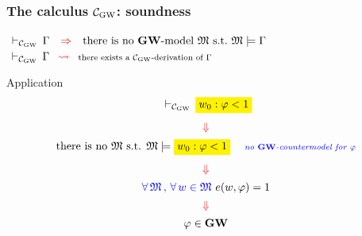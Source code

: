 \begin{frame}
  \frametitle{The calculus $\mathcal{C}_{\mathrm{GW}}$: soundness}
  

  \begin{center}
    \begin{tcolorbox}[colframe=blue!75!black,width=30em]
      \center
      $
      {}\,\vdash_{\mathcal{C}_{\mathrm{GW}}}\, \Gamma
      \quad {\color{red} \Rightarrow}\quad
      \mbox{there is no $\mathbf{GW}$-model $\mathfrak{M}$ s.t.}~\mathfrak{M}\models\Gamma
      $
      \\[1ex]
      $\scriptsize {}\,\vdash_{\mathcal{C}_{\mathrm{GW}}}\, \Gamma \quad {\color{red}\rightsquigarrow} \quad \mbox{there exists a $\mathcal{C}_{\mathrm{GW}}$-derivation of $\Gamma$}$
    \end{tcolorbox}
  \end{center}

  
  \SP

  {\small
    \begin{tcgreenbox}{Application}
    \vspace{-2ex}
    \[
    \begin{array}{c}
      \proves{\Calc}{}{\ycbox{$w_0:\varphi<1$}}
      \\[2ex] 
      \tr{\Downarrow}
      \\[1ex] 
      \mbox{there is no $\M$ s.t. $\M\models \ycbox{$w_0:\varphi <1$}$}
\quad  \text{\blue\em\scriptsize \emph\ no $\GWL$-countermodel for $\varphi$}
      \\[2ex]
        \tr{\Downarrow}
        \\[1ex] 
      \tb{\forall\,\M\,,\,\forall\,w\in\M}~e(w,\varphi)=1
      \\[1ex]
        \tr{\Downarrow}
        \\[1ex]
        \varphi\in\GWL
    \end{array}
    \]
    \vspace{.5ex}
  \end{tcgreenbox}
  }

  
  
  \VFILL
\end{frame}


